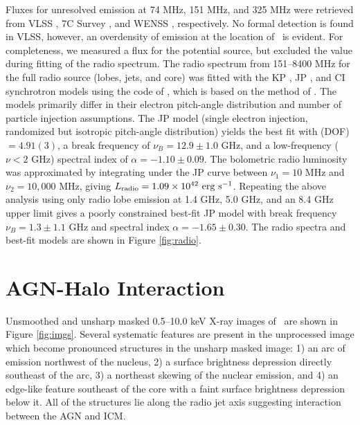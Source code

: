 \documentclass[useAMS,usenatbib]{mn2e}
\begin{document}
Fluxes for unresolved emission at 74 MHz, 151 MHz, and 325 MHz were
retrieved from VLSS \citep{vlss}, 7C Survey
\citep{1999MNRAS.306...31R}, and WENSS \citep{1997A&AS..124..259R},
respectively. No formal detection is found in VLSS, however, an
overdensity of emission at the location of \irs\ is evident. For
completeness, we measured a flux for the potential source, but
excluded the value during fitting of the radio spectrum. The radio
spectrum from 151--8400 MHz for the full radio source (lobes, jets,
and core) was fitted with the KP \citep{1962SvA.....6..317K, pach}, JP
\citep{1973A&A....26..423J}, and CI \citep{1987MNRAS.225..335H}
synchrotron models using the code of \citet{2005ApJ...624..656W},
which is based on the method of \citet{1991ApJ...383..554C}. The
models primarily differ in their electron pitch-angle distribution and
number of particle injection assumptions. The JP model (single
electron injection, randomized but isotropic pitch-angle distribution)
yields the best fit with \chisq(DOF)$ = 4.91(3)$, a break frequency of
$\nu_B = 12.9 \pm 1.0$ GHz, and a low-frequency ($\nu < 2$ GHz)
spectral index of $\alpha = -1.10 \pm 0.09$. The bolometric radio
luminosity was approximated by integrating under the JP curve between
$\nu_1 = 10$ MHz and $\nu_2 = 10,000$ MHz, giving $L_{\rm{radio}} = 1.09 \times
10^{42}~\rm{\mbox{\ensuremath{\rm{erg}}}~\ensuremath{\rm{\mbox{\ensuremath{\rm{s}}}^{-1}}}}$. Repeating the above analysis using only radio lobe
emission at 1.4 GHz, 5.0 GHz, and an 8.4 GHz upper limit gives a
poorly constrained best-fit JP model with break frequency $\nu_B = 1.3
\pm 1.1$ GHz and spectral index $\alpha = -1.65 \pm 0.30$. The radio
spectra and best-fit models are shown in Figure \ref{fig:radio}.

\section{AGN-Halo Interaction}
\label{sec:sub}

Unsmoothed and unsharp masked 0.5--10.0 keV X-ray images of \irs\ are
shown in Figure \ref{fig:imgs}. Several systematic features are
present in the unprocessed image which become pronounced structures in
the unsharp masked image: 1) an arc of emission northwest of the
nucleus, 2) a surface brightness depression directly southeast of the
arc, 3) a northeast skewing of the nuclear emission, and 4) an
edge-like feature southeast of the core with a faint surface
brightness depression below it. All of the structures lie along the
radio jet axis suggesting interaction between the AGN and ICM.
\end{document}
